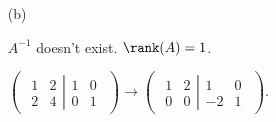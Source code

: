 \begin{Exercise}
\begin{enumerate}[(a)]
		\item[(b)]
		\begin{answer}
			$A^{-1}$ doesn't exist. $\rank(A) = 1$.
		\end{answer}
		\begin{solution}
			$\begin{pmatrix} \left.\begin{matrix}
			1 & 2 \\
			2 & 4
			\end{matrix} \right| \begin{matrix}
			1 & 0 \\
			0 & 1
			\end{matrix} \end{pmatrix} \longrightarrow \begin{pmatrix} \left.\begin{matrix}
			1 & 2 \\
			0 & 0
			\end{matrix} \right| \begin{matrix}
			1 & 0 \\
			-2 & 1
			\end{matrix} \end{pmatrix}$.
		\end{solution}
		

\end{enumerate}
\end{Exercise}

